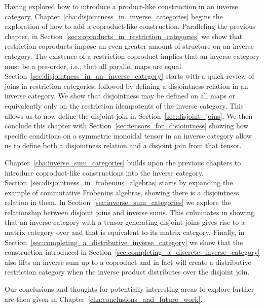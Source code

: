 Having explored how to introduce a product-like construction in an inverse category,
Chapter~\ref{cha:disjointness_in_inverse_categories} begins the exploration of how to add a
coproduct-like construction. Paralleling the previous chapter, in
Section~\ref{sec:coproducts_in_restriction_categories} we show that restriction coproducts
impose an even greater amount of structure on an inverse category. The existence of a restriction
coproduct implies that an inverse category must be a pre-order, i.e., that all parallel maps are
equal. Section~\ref{sec:disjointness_in_an_inverse_category} starts with a quick review of joins in
restriction categories, followed by defining a disjointness relation in an inverse category. We show
that disjointness may be defined on all maps or equivalently only on the restriction idempotents of
the inverse category. This allows us to now define the disjoint join in
Section~\ref{sec:disjoint_joins}. We then conclude this chapter with
Section~\ref{sec:tensors_for_disjointness} showing how specific conditions on a symmetric monoidal
tensor in an inverse category allow us to define both a disjointness relation and a disjoint join
from that tensor.

Chapter~\ref{cha:inverse_sum_categories} builds upon the previous chapters to introduce
coproduct-like constructions into the inverse
category. Section~\ref{sec:disjointness_in_frobenius_algebras} starts by expanding the example of
commutative Frobenius algebras, showing there is a disjointness relation in them. In
Section~\ref{sec:inverse_sum_categories} we explore the relationship between disjoint joins and
inverse sums. This culminates in showing that an inverse category \X with a tensor generating disjoint
joins gives rise to a matrix category over \X and that \X is equivalent to its matrix
category. Finally, in Section~\ref{sec:completing_a_distributive_inverse_category} we show that the
construction introduced in Section~\ref{sec:completing_a_discrete_inverse_category} also lifts an
inverse sum up to a coproduct and in fact will create a distributive restriction category when the
inverse product distributes over the disjoint join.

Our conclusions and thoughts for potentially interesting areas to explore further are then given in
Chapter~\ref{cha:conclusions_and_future_work}.



